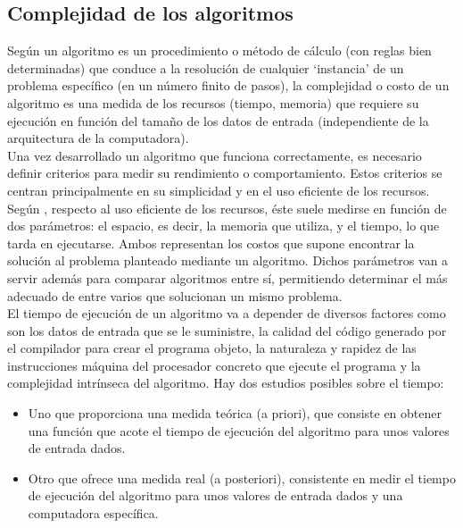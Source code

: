 \subsection{Complejidad de los algoritmos}\label{subsection:Complejidad_de_los_algoritmos}
Según \cite{[Lleida]} un algoritmo es un procedimiento o método de cálculo (con reglas bien determinadas) que conduce a la resolución de cualquier `instancia' de un problema específico (en un número finito de pasos), la complejidad o costo de un algoritmo es una medida de los recursos (tiempo, memoria) que requiere su ejecución en función del tamaño de los datos de entrada (independiente de la arquitectura de la computadora).\\
\hspace*{1cm}Una vez desarrollado un algoritmo que funciona correctamente, es necesario  definir criterios para medir su rendimiento o comportamiento. Estos criterios se centran principalmente en su simplicidad y en el uso eficiente de los recursos.\\ 
\hspace*{1cm}Según \cite{[GUE99]}, respecto al uso eficiente de los recursos, éste suele medirse en función de dos parámetros: el espacio, es decir, la memoria que utiliza, y el tiempo, lo que tarda en ejecutarse. Ambos representan los costos que supone encontrar la solución al problema planteado mediante un algoritmo. Dichos parámetros van a servir además para comparar algoritmos entre sí, permitiendo determinar el más adecuado de entre varios que solucionan un mismo problema.\\
\hspace*{1cm}El tiempo de ejecución de un algoritmo va a depender de diversos factores como son los datos de entrada que se le suministre, la calidad del código generado por el compilador para crear el programa objeto, la naturaleza y rapidez de las instrucciones máquina del procesador concreto que ejecute el programa y la complejidad intrínseca del algoritmo. Hay dos estudios posibles sobre el tiempo:

\begin{itemize}
\item Uno que proporciona una medida teórica (a priori), que consiste en obtener una función que acote el tiempo de ejecución del algoritmo para unos valores de entrada dados.
\item Otro que ofrece una medida real (a posteriori), consistente en medir el tiempo de ejecución del algoritmo para unos valores de entrada dados y una computadora específica.
\end{itemize}

